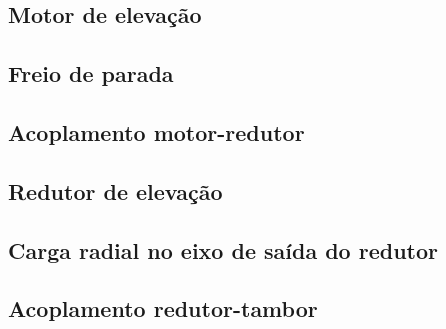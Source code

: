 \subsection{Motor de elevação}


\subsection{Freio de parada}


\subsection{Acoplamento motor-redutor}


\subsection{Redutor de elevação}


\subsection{Carga radial no eixo de saída do redutor}


\subsection{Acoplamento redutor-tambor}

